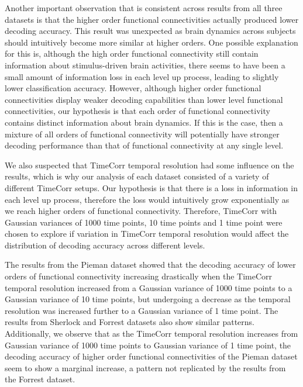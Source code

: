\documentclass[11pt]{article}
\begin{document}
Another important observation that is consistent across results from all three datasets is that the higher order functional connectivities actually produced lower decoding accuracy. This result was unexpected as brain dynamics across subjects should intuitively become more similar at higher orders. One possible explanation for this is, although the high order functional connectivity still contain information about stimulus-driven brain activities, there seems to have been a small amount of information loss in each level up process, leading to slightly lower classification accuracy. However, although higher order functional connectivities display weaker decoding capabilities than lower level functional connectivities, our hypothesis is that each order of functional connectivity contains distinct information about brain dynamics. If this is the case, then a mixture of all orders of functional connectivity will potentially have stronger decoding performance than that of functional connectivity at any single level.

We also suspected that TimeCorr temporal resolution had some influence on the results, which is why our analysis of each dataset consisted of a variety of different TimeCorr setups. Our hypothesis is that there is a loss in information in each level up process, therefore the loss would intuitively grow exponentially as we reach higher orders of functional connectivity. Therefore, TimeCorr with Gaussian variances of 1000 time points, 10 time points and 1 time point were chosen to explore if variation in TimeCorr temporal resolution would affect the distribution of decoding accuracy across different levels.

The results from the Pieman dataset showed that the decoding accuracy of lower orders of functional connectivity increasing drastically when the TimeCorr temporal resolution increased from a Gaussian variance of 1000 time points to a Gaussian variance of 10 time points, but undergoing a decrease as the temporal resolution was increased further to a Gaussian variance of 1 time point. The results from Sherlock and Forrest datasets also show similar patterns. Additionally, we observe that as the TimeCorr temporal resolution increases from Gaussian variance of 1000 time points to Gaussian variance of 1 time point, the decoding accuracy of higher order functional connectivities of the Pieman dataset seem to show a marginal increase, a pattern not replicated by the results from the Forrest dataset.
\end{document}
